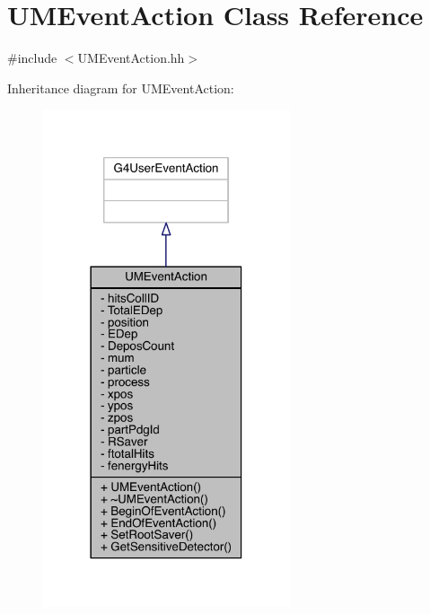 \hypertarget{classUMEventAction}{}\section{U\+M\+Event\+Action Class Reference}
\label{classUMEventAction}


{\ttfamily \#include $<$U\+M\+Event\+Action.\+hh$>$}



Inheritance diagram for U\+M\+Event\+Action\+:
\nopagebreak
\begin{figure}[H]
\begin{center}
\leavevmode
\includegraphics[width=206pt]{classUMEventAction__inherit__graph}
\end{center}
\end{figure}


